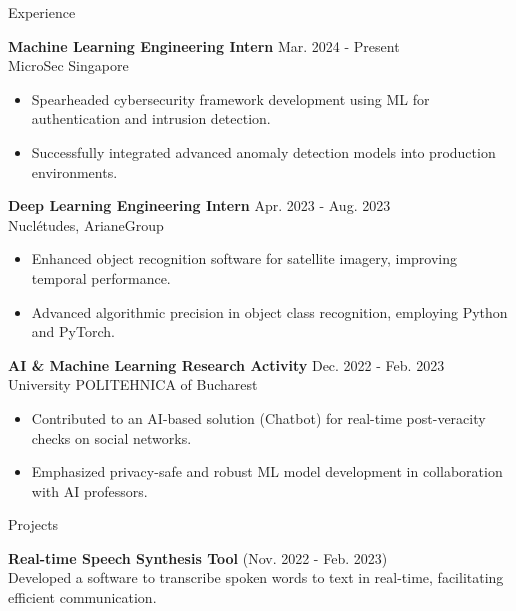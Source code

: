\documentclass{resume} %
\begin{document}
\begin{rSection}{Experience}

\textbf{Machine Learning Engineering Intern} \hfill {Mar. 2024 - Present} \\
MicroSec Singapore
\begin{itemize}
    \itemsep -3pt {} 
     \item Spearheaded cybersecurity framework development using ML for authentication and intrusion detection.
     \item Successfully integrated advanced anomaly detection models into production environments.
\end{itemize}

\textbf{Deep Learning Engineering Intern} \hfill {Apr. 2023 - Aug. 2023} \\
Nuclétudes, ArianeGroup
\begin{itemize}
    \itemsep -3pt {} 
     \item Enhanced object recognition software for satellite imagery, improving temporal performance.
     \item Advanced algorithmic precision in object class recognition, employing Python and PyTorch.
\end{itemize}

\textbf{AI \& Machine Learning Research Activity} \hfill {Dec. 2022 - Feb. 2023} \\
University POLITEHNICA of Bucharest
\begin{itemize}
    \itemsep -3pt {} 
     \item Contributed to an AI-based solution (Chatbot) for real-time post-veracity checks on social networks.
     \item Emphasized privacy-safe and robust ML model development in collaboration with AI professors.
\end{itemize}

\end{rSection} 


\begin{rSection}{Projects}

\item \textbf{Real-time Speech Synthesis Tool} (Nov. 2022 - Feb. 2023) \\
Developed a software to transcribe spoken words to text in real-time, facilitating efficient communication.

\end{rSection} 
\end{document}
